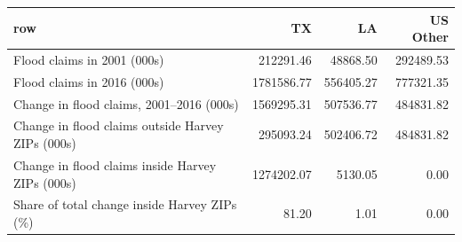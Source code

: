 \begin{tabular}{lrrr}
  \hline
row & TX & LA & US Other \\ 
  \hline
Flood claims in 2001 (000s) & 212291.46 & 48868.50 & 292489.53 \\ 
  Flood claims in 2016 (000s) & 1781586.77 & 556405.27 & 777321.35 \\ 
  Change in flood claims, 2001--2016 (000s) & 1569295.31 & 507536.77 & 484831.82 \\ 
  Change in flood claims outside Harvey ZIPs (000s) & 295093.24 & 502406.72 & 484831.82 \\ 
  Change in flood claims inside Harvey ZIPs (000s) & 1274202.07 & 5130.05 & 0.00 \\ 
  Share of total change inside Harvey ZIPs (\%) & 81.20 & 1.01 & 0.00 \\ 
   \hline
\end{tabular}

